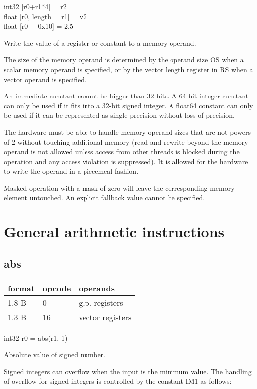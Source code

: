 \documentclass[forwardcom.tex]{subfiles}
\begin{document}
int32 [r0+r1*4] = r2\\ 
float [r0, length = r1] = v2 \\
float [r0 + 0x10] = 2.5
\vv

Write the value of a register or constant to a memory operand.
\vv

The size of the memory operand is determined by the operand size OS when a scalar memory operand is specified, or by the vector length register in RS when a vector operand is specified.
\vv

An immediate constant cannot be bigger than 32 bits. A 64 bit integer constant can only be used if it fits into a 32-bit signed integer. A float64 constant can only be used if it can be represented as single precision without loss of precision.
\vv

The hardware must be able to handle memory operand sizes that are not powers of 2 without touching additional memory (read and rewrite beyond the memory operand is not allowed unless access from other threads is blocked during the operation and any access violation is suppressed). 
It is allowed for the hardware to write the operand in a piecemeal fashion.
\vv

Masked operation with a mask of zero will leave the corresponding memory element untouched. An explicit fallback value cannot be specified.
\vv


\section{General arithmetic instructions}

\subsection{abs}
\label{table:absInstruction}
\begin{tabular}{|p{12mm}|p{15mm}|p{100mm}|}
\hline
\bfseries format & \bfseries opcode & \bfseries operands \\ \hline
1.8 B &  0 & g.p. registers \\ \hline
1.3 B & 16 & vector registers \\ \hline
\end{tabular}
\vv

int32 r0 = abs(r1, 1)
\vv

Absolute value of signed number.
\vv

Signed integers can overflow when the input is the minimum value.
The handling of overflow for signed integers is controlled by the constant IM1 as follows:
\end{document}
